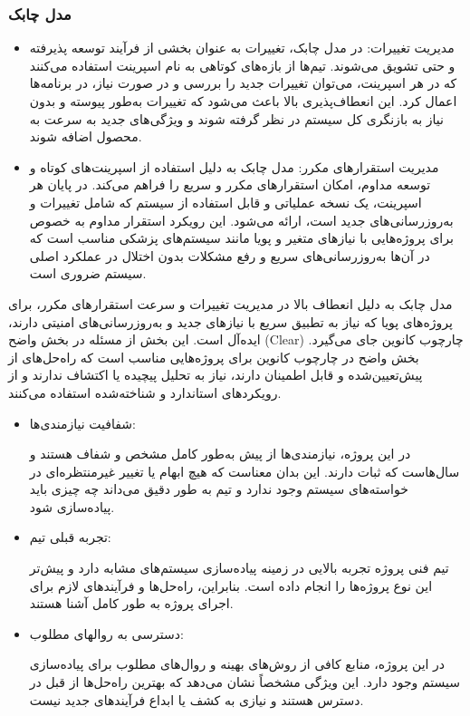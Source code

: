 \subsubsection*{مدل چابک}
\begin{itemize}
    \item مدیریت تغییرات: در مدل چابک، تغییرات به عنوان بخشی از فرآیند توسعه پذیرفته و حتی تشویق می‌شوند. تیم‌ها از بازه‌های کوتاهی به نام اسپرینت استفاده می‌کنند که در هر اسپرینت، می‌توان تغییرات جدید را بررسی و در صورت نیاز، در برنامه‌ها اعمال کرد. این انعطاف‌پذیری بالا باعث می‌شود که تغییرات به‌طور پیوسته و بدون نیاز به بازنگری کل سیستم در نظر گرفته شوند و ویژگی‌های جدید به سرعت به محصول اضافه شوند.
    \item مدیریت استقرارهای مکرر: مدل چابک به دلیل استفاده از اسپرینت‌های کوتاه و توسعه مداوم، امکان استقرارهای مکرر و سریع را فراهم می‌کند. در پایان هر اسپرینت، یک نسخه عملیاتی و قابل استفاده از سیستم که شامل تغییرات و به‌روزرسانی‌های جدید است، ارائه می‌شود. این رویکرد استقرار مداوم به خصوص برای پروژه‌هایی با نیازهای متغیر و پویا مانند سیستم‌های پزشکی مناسب است که در آن‌ها به‌روزرسانی‌های سریع و رفع مشکلات بدون اختلال در عملکرد اصلی سیستم ضروری است.
\end{itemize}
مدل چابک به دلیل انعطاف بالا در مدیریت تغییرات و سرعت استقرارهای مکرر، برای پروژه‌های پویا که نیاز به تطبیق سریع با نیازهای جدید و به‌روزرسانی‌های امنیتی دارند، ایده‌آل است.
این بخش از مسئله در بخش واضح (Clear) چارچوب کانوین جای می‌گیرد. بخش واضح در چارچوب کانوین برای پروژه‌هایی مناسب است که راه‌حل‌های از پیش‌تعیین‌شده و قابل اطمینان دارند، نیاز به تحلیل پیچیده یا اکتشاف ندارند و از رویکردهای استاندارد و شناخته‌شده استفاده می‌کنند.
\begin{itemize}
    \item شفافیت نیازمندی‌ها:
    
    در این پروژه، نیازمندی‌ها از پیش به‌طور کامل مشخص و شفاف هستند و سال‌هاست که ثبات دارند. این بدان معناست که هیچ ابهام یا تغییر غیرمنتظره‌ای در خواسته‌های سیستم وجود ندارد و تیم به طور دقیق می‌داند چه چیزی باید پیاده‌سازی شود.
    \item تجربه قبلی تیم:
    
    تیم فنی پروژه تجربه بالایی در زمینه پیاده‌سازی سیستم‌های مشابه دارد و پیش‌تر این نوع پروژه‌ها را انجام داده است. بنابراین، راه‌حل‌ها و فرآیندهای لازم برای اجرای پروژه به طور کامل آشنا هستند.

    \item دسترسی به روالهای مطلوب:
    
    در این پروژه، منابع کافی از روش‌های بهینه و روال‌های مطلوب برای پیاده‌سازی سیستم وجود دارد. این ویژگی مشخصاً نشان می‌دهد که بهترین راه‌حل‌ها از قبل در دسترس هستند و نیازی به کشف یا ابداع فرآیندهای جدید نیست.
\end{itemize}


